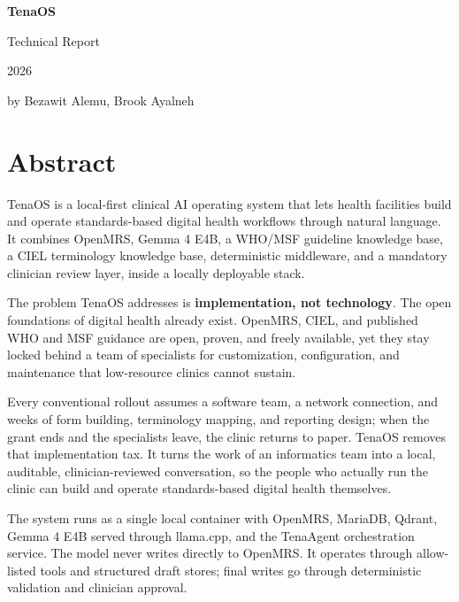 \documentclass[11pt]{article}
\newcommand{\Product}{TenaOS}
\newcommand{\Gemma}{Gemma 4 E4B}
\newcommand{\OpenMRS}{OpenMRS}
\newcommand{\CIEL}{CIEL}
\newcommand{\WHO}{WHO/MSF}
\newcommand{\code}[1]{{\setlength{\fboxsep}{1.7pt}\colorbox{codebg}{\textcolor{codeink}{\small\ttfamily #1}}}}
\begin{document}
\begin{titlepage}
\thispagestyle{empty}
\color{black}
\centering
\vspace*{0.30\textheight}

{\fontsize{60}{64}\selectfont\bfseries\color{brandteal} TenaOS\par}
\vspace{14pt}
{\Large Technical Report\par}

\vfill

{\large 2026\par}
\vspace{12pt}
{\large by Bezawit Alemu, Brook Ayalneh\par}
\vspace*{0.12\textheight}
\end{titlepage}
\color{brandink}

\section{Abstract}

\begin{abstractbox}
\Product{} is a local-first clinical AI operating system that lets health facilities build and operate standards-based digital health workflows through natural language. It combines \OpenMRS{}, \Gemma{}, a \WHO{} guideline knowledge base, a \CIEL{} terminology knowledge base, deterministic middleware, and a mandatory clinician review layer, inside a locally deployable stack.

\smallskip
The problem \Product{} addresses is \textbf{implementation, not technology}. The open foundations of digital health already exist. \OpenMRS{}, \CIEL{}, and published WHO and MSF guidance are open, proven, and freely available, yet they stay locked behind a team of specialists for customization, configuration, and maintenance that low-resource clinics cannot sustain.

\smallskip
Every conventional rollout assumes a software team, a network connection, and weeks of form building, terminology mapping, and reporting design; when the grant ends and the specialists leave, the clinic returns to paper. \Product{} removes that implementation tax. It turns the work of an informatics team into a local, auditable, clinician-reviewed conversation, so the people who actually run the clinic can build and operate standards-based digital health themselves.

\smallskip
The system runs as a single local container with \OpenMRS{}, MariaDB, Qdrant, \Gemma{} served through \code{llama.cpp}, and the TenaAgent orchestration service. The model never writes directly to \OpenMRS{}. It operates through allow-listed tools and structured draft stores; final writes go through deterministic validation and clinician approval.
\end{abstractbox}
\end{document}
